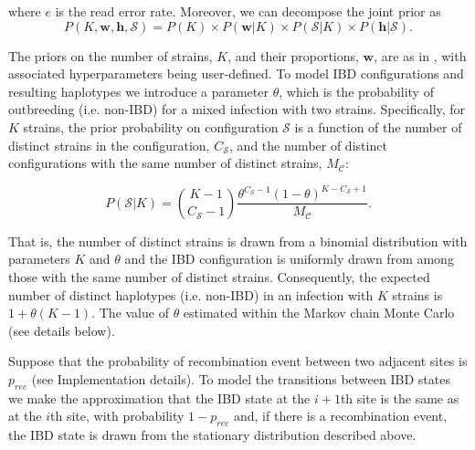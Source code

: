 \documentclass[9pt,lineno]{elife}
\begin{document}
\begin{appendixbox}
\noindent where $e$ is the read error rate.  Moreover, we can decompose the joint prior as
\begin{equation}
P(K, \mathbf{w}, \mathbf{h}, \mathcal{S}) = P(K) \times P(\mathbf{w}|K) \times P(\mathcal{S}|K) \times P(\mathbf{h}|\mathcal{S}).
\end{equation}

\noindent The priors on the number of strains, $K$, and their proportions, $\mathbf{w}$, are as in \citet{Zhu2017}, with associated hyperparameters being user-defined.  To model IBD configurations and resulting haplotypes we introduce a parameter $\theta$, which is the probability of outbreeding (i.e. non-IBD) for a mixed infection with two strains.  Specifically, for $K$ strains, the prior probability on configuration $\mathcal{S}$ is a function of the number of distinct strains in the configuration, $C_{\mathcal{S}}$, and the number of distinct configurations with the same number of distinct strains, $M_{\mathcal{C}}$:

\begin{equation}
    P(\mathcal{S}|K) = \genfrac{(}{)}{0pt}{}{K-1}{C_{\mathcal{S}}-1} \frac{\theta^{C_{\mathcal{S}}-1}(1-\theta)^{K-C_{\mathcal{S}}+1}}{M_{\mathcal{C}}}.
\end{equation}

\noindent That is, the number of distinct strains is drawn from a binomial distribution with parameters $K$ and $\theta$ and the IBD configuration is uniformly drawn from among those with the same number of distinct strains.  Consequently, the expected number of distinct haplotypes (i.e. non-IBD) in an infection with $K$ strains is $1+\theta (K-1)$. The value of $\theta$ estimated within the Markov chain Monte Carlo (see details below).


Suppose that the probability of recombination event between two adjacent sites is $p_{rec}$ (see Implementation details).
To model the transitions between IBD states we make the approximation that the IBD state at the $i+1$th site is the same as at the $i$th site, with probability $1-p_{rec}$ and, if there is a recombination event, the IBD state is drawn from the stationary distribution described above.


\end{appendixbox}
\end{document}
